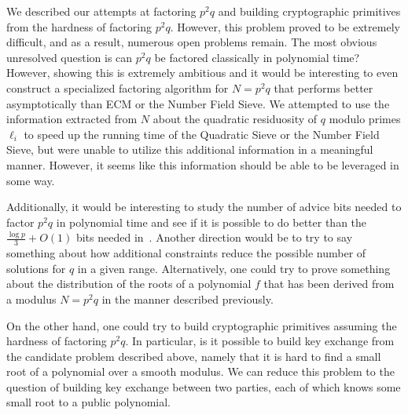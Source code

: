 \documentclass[letterpaper,twocolumn,10pt]{article}
\begin{document}
We described our attempts at factoring $p^2 q$ and building cryptographic primitives from the hardness of factoring $p^2 q$. However, this problem proved to be extremely difficult, and as a result, numerous open problems remain. The most obvious unresolved question is can $p^2 q$ be factored classically in polynomial time? However, showing this is extremely ambitious and it would be interesting to even construct a specialized factoring algorithm for $N = p^2 q$ that performs better asymptotically than ECM or the Number Field Sieve. We attempted to use the information extracted from $N$ about the quadratic residuosity of $q$ modulo primes $\ell_i$ to speed up the running time of the Quadratic Sieve or the Number Field Sieve, but were unable to utilize this additional information in a meaningful manner. However, it seems like this information should be able to be leveraged in some way.

Additionally, it would be interesting to study the number of advice bits needed to factor $p^2 q$ in polynomial time and see if it is possible to do better than the $\frac{\log p}{3} + O(1)$ bits needed in~\cite{dan}. Another direction would be to try to say something about how additional constraints reduce the possible number of solutions for $q$ in a given range. Alternatively, one could try to prove something about the distribution of the roots of a polynomial $f$ that has been derived from a modulus $N = p^2 q$ in the manner described previously. 

On the other hand, one could try to build cryptographic primitives assuming the hardness of factoring $p^2 q$. In particular, is it possible to build key exchange from the candidate problem described above, namely that it is hard to find a small root of a polynomial over a smooth modulus. We can reduce this problem to the question of building key exchange between two parties, each of which knows some small root to a public polynomial. 

{\footnotesize 
}


\end{document}
